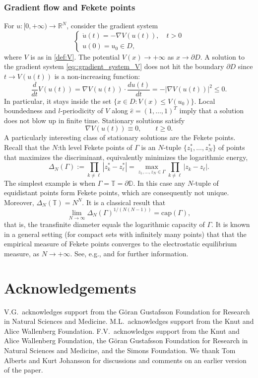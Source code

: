 \documentclass[11pt]{article}
\numberwithin{equation}{section}
\theoremstyle{definition}
\begin{document}
\subsubsection*{Gradient flow and Fekete points}
For $u:[0,+\infty)\to \mathbb{R}^{N}$, consider the gradient system 
\begin{equation}\label{eq::gradient_system_V}
\begin{cases}
    \dot u(t) = - \nabla V(u(t)), \quad t>0\\
    u(0) = u_{0}\in D,
\end{cases}
\end{equation}
where $V$ is as in \eqref{def:V}.
The potential $V(x)\to +\infty$ as $x\to \partial D$. A solution to the gradient system \eqref{eq::gradient_system_V} does not hit the boundary $\partial D$ since $t\to V(u(t))$ is a non-increasing function:
\[
    \frac{d}{dt}V(u(t)) = \nabla V(u(t))\cdot \frac{du(t)}{dt}  = -|\nabla V(u(t))|^2 \le 0.
\]
In particular, it stays inside the set $\{x\in D: V(x)\le V(u_{0})\}$. Local boundedness and $l$-periodicity of $V$ along $\hat{e} = (1,\dots, 1)^{T}$ imply that a solution does not blow up in finite time. Stationary solutions satisfy
\[
\nabla V(u(t)) \equiv 0, \qquad t \ge 0.
\]
A particularly interesting class of stationary solutions are the Fekete points. Recall that the $N$:th level Fekete points of $\Gamma$ is an $N$-tuple $\{z_{1}^{*},\dots , z_{N}^{*}\}$ of points that maximizes the discriminant, equivalently minimizes the logarithmic energy,
\[
\Delta_N(\Gamma) := \prod_{k\neq \ell} |z_k^*-z_\ell^*| =  \max_{z_1, \ldots, z_N \in \Gamma} \prod_{k\neq \ell} |z_k-z_\ell|.
\]
The simplest example is when $\Gamma=\mathbb{T} = \partial \mathbb{D}$. In this case any $N$-tuple of equidistant points form Fekete points, which are consequently not unique. Moreover, $\Delta_N(\mathbb{T})=N^N$. It is a classical result that
\[
\lim_{N \to \infty} \Delta_N(\Gamma)^{1/(N(N-1))} = \textrm{cap}(\Gamma),
\]
that is, the transfinite diameter equals the logarithmic capacity of $\Gamma$. It is known in a general setting (for compact sets with infinitely many points) that that the empirical measure of Fekete points converges to the electrostatic equilibrium measure, as $N\to+\infty$. See, e.g., \cite[p. 285]{Hille1973_AFT2} and \cite{Pommerenke1967Fekete} for further information.

\section*{Acknowledgements}
V.G.\ acknowledges support from the Göran Gustafsson Foundation for Research in Natural Sciences and Medicine. M.L.\  acknowledges support from the Knut and Alice Wallenberg Foundation. F.V.\ acknowledges support from the Knut and Alice Wallenberg Foundation, the Göran Gustafsson Foundation for Research in Natural Sciences and Medicine,  and the Simons Foundation. We thank Tom Alberts and Kurt Johansson for discussions and comments on an earlier version of the paper.
\end{document}
